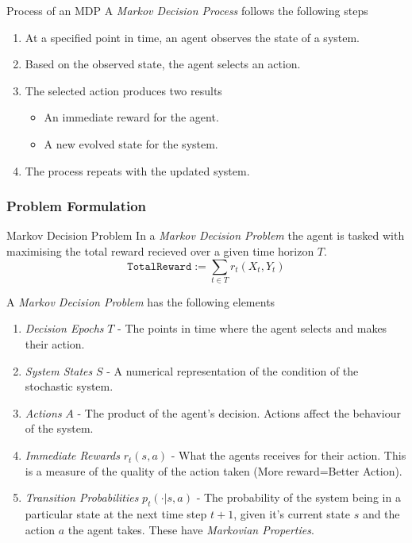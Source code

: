 \documentclass[11pt,a4paper]{article}
\begin{document}
  \begin{proposition}{Process of an MDP}
    A \textit{Markov Decision Process} follows the following steps
    \begin{enumerate}
      \item At a specified point in time, an agent observes the state of a system.
      \item Based on the observed state, the agent selects an action.
      \item The selected action produces two results
      \begin{itemize}
        \item An immediate reward for the agent.
        \item A new evolved state for the system.
      \end{itemize}
      \item The process repeats with the updated system.
    \end{enumerate}
  \end{proposition}

\subsubsection{Problem Formulation}

  \begin{definition}{Markov Decision Problem}
    In a \textit{Markov Decision Problem} the agent is tasked with maximising the total reward recieved over a given time horizon $T$.
    \[ \mathtt{TotalReward}:=\sum_{t\in T}r_t(X_t,Y_t) \]
    \par A \textit{Markov Decision Problem} has the following elements
    \begin{enumerate}
      \item \textit{Decision Epochs} $T$ - The points in time where the agent selects and makes their action.
      \item \textit{System States} $S$ - A numerical representation of the condition of the stochastic system.
      \item \textit{Actions} $A$ - The product of the agent's decision. Actions affect the behaviour of the system.
      \item \textit{Immediate Rewards} $r_t(s,a)$ - What the agents receives for their action. This is a measure of the quality of the action taken (More reward=Better Action).
      \item \textit{Transition Probabilities} $p_t(\cdot|s,a)$ - The probability of the system being in a particular state at the next time step $t+1$, given it's current state $s$ and the action $a$ the agent takes. These have \textit{Markovian Properties}.
    \end{enumerate}
  \end{definition}
\end{document}
